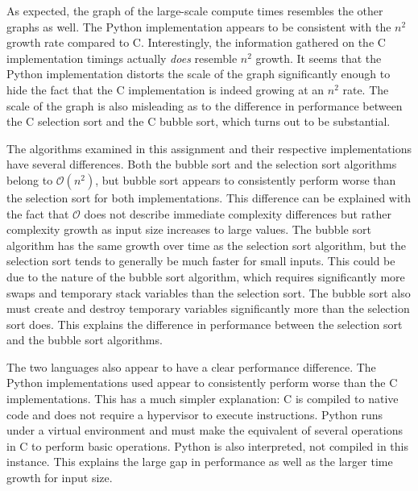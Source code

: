 \documentclass{article}
\begin{document}
As expected, the graph of the large-scale compute times resembles the other graphs as well. The Python implementation appears to be consistent with the $n^2$ growth rate compared to C. Interestingly, the information gathered on the C implementation timings actually \textit{does} resemble $n^2$ growth. It seems that the Python implementation distorts the scale of the graph significantly enough to hide the fact that the C implementation is indeed growing at an $n^2$ rate. The scale of the graph is also misleading as to the difference in performance between the C selection sort and the C bubble sort, which turns out to be substantial.

The algorithms examined in this assignment and their respective implementations have several differences. Both the bubble sort and the selection sort algorithms belong to $\mathcal{O}(n^2)$, but bubble sort appears to consistently perform worse than the selection sort for both implementations. This difference can be explained with the fact that $\mathcal{O}$ does not describe immediate complexity differences but rather complexity growth as input size increases to large values. The bubble sort algorithm has the same growth over time as the selection sort algorithm, but the selection sort tends to generally be much faster for small inputs. This could be due to the nature of the bubble sort algorithm, which requires significantly more swaps and temporary stack variables than the selection sort. The bubble sort also must create and destroy temporary variables significantly more than the selection sort does. This explains the difference in performance between the selection sort and the bubble sort algorithms.

The two languages also appear to have a clear performance difference. The Python implementations used appear to consistently perform worse than the C implementations. This has a much simpler explanation: C is compiled to native code and does not require a hypervisor to execute instructions. Python runs under a virtual environment and must make the equivalent of several operations in C to perform basic operations. Python is also interpreted, not compiled in this instance. This explains the large gap in performance as well as the larger time growth for input size.
\end{document}
